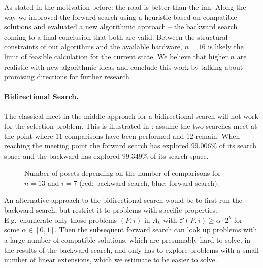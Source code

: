 \documentclass[twoside,leqno,twocolumn]{article}
\begin{document}
As stated in the motivation before: the road is better than the inn.
Along the way we improved the forward search using a heuristic based on compatible solutions and evaluated a new algorithmic approach -- the backward search coming to a final conclusion that both are valid.
%
Between the structural constraints of our algorithms and the available hardware, $n=16$ is likely the limit of feasible calculation for the current state.
We believe that higher $n$ are realistic with new algorithmic ideas and conclude this work by talking about promising directions for further research.

\paragraph{Bidirectional Search.}
The classical meet in the middle approach for a bidirectional search will not work for the selection problem.
This is illustrated in :
assume the two searches meet at the point where $11$ comparisons have been performed and $12$ remain.
When reaching the meeting point the forward search has explored $99.006\%$ of its search space and the backward has explored $99.349\%$ of its search space.

\begin{figure}[!b]
  \centering
  
  \caption{Number of posets depending on the number of comparisons for $n = 13$ and $i = 7$ (red: backward search, blue: forward search).}
  \label{fig:backward_forward_count_13_6}
\end{figure}

An alternative approach to the bidirectional search would be to first run the backward search, but restrict it to problems with specific properties.
E.g.\ enumerate only those problems $(P, i)$ in $A_k$ with $\mathcal{C}(P, i) \ge \alpha \cdot 2^k$ for some $\alpha \in [0, 1]$.
Then the subsequent forward search can look up problems with a large number of compatible solutions, which are presumably hard to solve, in the results of the backward search, and only has to explore problems with a small number of linear extensions, which we estimate to be easier to solve.
\end{document}
